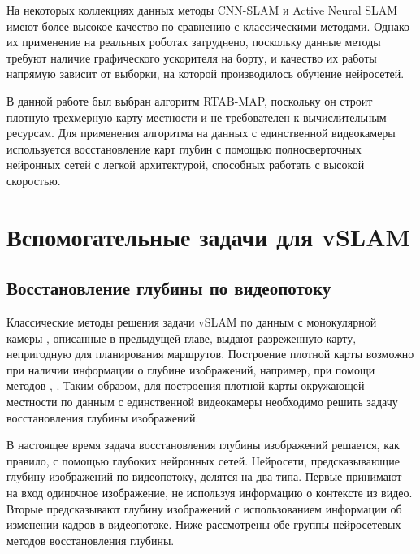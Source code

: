 \documentclass{mipt-thesis-ms}
\begin{document}
	На некоторых коллекциях данных методы CNN-SLAM и Active Neural SLAM имеют более высокое качество по сравнению с классическими методами. Однако их применение на реальных роботах затруднено, поскольку данные методы требуют наличие графического ускорителя на борту, и качество их работы напрямую зависит от выборки, на которой производилось обучение нейросетей.
	
	В данной работе был выбран алгоритм RTAB-MAP, поскольку он строит плотную трехмерную карту местности и не требователен к вычислительным ресурсам. Для применения алгоритма на данных с единственной видеокамеры используется восстановление карт глубин с помощью полносверточных нейронных сетей с легкой архитектурой, способных работать с высокой скоростью.
		
	
	\chapter{Вспомогательные задачи для vSLAM}
	
	\section{Восстановление глубины по видеопотоку}
	
	Классические методы решения задачи vSLAM по данным с монокулярной камеры \cite{mur2015orb} \cite{engel2014lsd}, описанные в предыдущей главе, выдают разреженную карту, непригодную для планирования маршрутов. Построение плотной карты возможно при наличии информации о глубине изображений, например, при помощи методов \cite{labbe2011memory}, \cite{endres20133}. Таким образом, для построения плотной карты окружающей местности по данным с единственной видеокамеры необходимо решить задачу восстановления глубины изображений.
	
	В настоящее время задача восстановления глубины изображений решается, как правило, с помощью глубоких нейронных сетей. Нейросети, предсказывающие глубину изображений по видеопотоку, делятся на два типа. Первые принимают на вход одиночное изображение, не используя информацию о контексте из видео. Вторые предсказывают глубину изображений с использованием информации об изменении кадров в видеопотоке. Ниже рассмотрены обе группы нейросетевых методов восстановления глубины.
	
\end{document}
